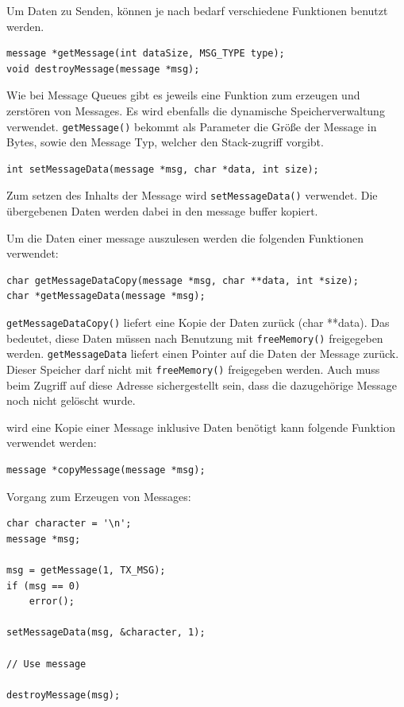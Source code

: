 \documentclass[fontsize=12pt, toc=bibliography, notitlepage]{scrreprt}
\begin{document}
Um Daten zu Senden, können je nach bedarf verschiedene Funktionen benutzt werden.

\begin{lstlisting}
message *getMessage(int dataSize, MSG_TYPE type);
void destroyMessage(message *msg);
\end{lstlisting}

Wie bei Message Queues gibt es jeweils eine Funktion zum erzeugen und zerstören von Messages. Es wird ebenfalls die dynamische Speicherverwaltung verwendet. \lstinline$getMessage()$ bekommt als Parameter die Größe der Message in Bytes, sowie den Message Typ, welcher den Stack-zugriff vorgibt.

\begin{lstlisting}
int setMessageData(message *msg, char *data, int size);
\end{lstlisting}

Zum setzen des Inhalts der Message wird \lstinline$setMessageData()$ verwendet. Die übergebenen Daten werden dabei in den message buffer kopiert.

Um die Daten einer message auszulesen werden die folgenden Funktionen verwendet:

\begin{lstlisting}
char getMessageDataCopy(message *msg, char **data, int *size);
char *getMessageData(message *msg);
\end{lstlisting}

\lstinline$getMessageDataCopy()$ liefert eine Kopie der Daten zurück (char **data). Das bedeutet, diese Daten müssen nach Benutzung mit \lstinline$freeMemory()$  freigegeben werden. \lstinline$getMessageData$ liefert einen Pointer auf die Daten der Message zurück. Dieser Speicher darf nicht mit \lstinline$freeMemory()$  freigegeben werden. Auch muss beim Zugriff auf diese Adresse sichergestellt sein, dass die dazugehörige Message noch nicht gelöscht wurde.

wird eine Kopie einer Message inklusive Daten benötigt kann folgende Funktion verwendet werden:

\begin{lstlisting}
message *copyMessage(message *msg);
\end{lstlisting}

Vorgang zum Erzeugen von Messages:

\begin{lstlisting}
char character = '\n';
message *msg;

msg = getMessage(1, TX_MSG);
if (msg == 0)
	error();
	
setMessageData(msg, &character, 1);

// Use message

destroyMessage(msg);
\end{lstlisting}
\end{document}
